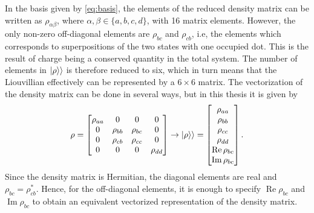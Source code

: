 \documentclass[../main.tex]{subfiles}
\begin{document}
In the basis given by \cref{eq:basis}, the elements of the reduced density matrix can be written as $\rho_{\alpha\beta}$, where $\alpha,\beta\in\{a,b,c,d\}$, with 16 matrix elements. However, the only non-zero off-diagonal elements are $\rho_{bc}$ and $\rho_{cb}$, i.e, the elements which corresponds to superpositions of the two states with one occupied dot. This is the result of charge being a conserved quantity in the total system. The number of elements in $\ket{\rho}\rangle$ is therefore reduced to six, which in turn means that the Liouvillian effectively can be represented by a $6\times6$ matrix. The vectorization of the density matrix can be done in several ways, but in this thesis it is given by
\begin{equation}\label{eq:order}
    \rho = \begin{bmatrix} \rho_{aa} & 0 & 0 & 0 \\
                    0 & \rho_{bb} & \rho_{bc} & 0 \\
                    0 & \rho_{cb} & \rho_{cc} & 0 \\
                    0 & 0 & 0 & \rho_{dd} \end{bmatrix} \rightarrow \ket{\rho}\rangle = \begin{bmatrix} \rho_{aa} \\ \rho_{bb} \\ \rho_{cc} \\ \rho_{dd} \\ \operatorname{Re}\rho_{bc} \\ \operatorname{Im}\rho_{bc}\end{bmatrix}.
\end{equation}
Since the density matrix is Hermitian, the diagonal elements are real and $\rho_{bc}=\rho_{cb}^*$. Hence, for the off-diagonal elements, it is enough to specify $\operatorname{Re}\rho_{bc}$ and $\operatorname{Im}\rho_{bc}$ to obtain an equivalent vectorized representation of the density matrix. %


\end{document}
